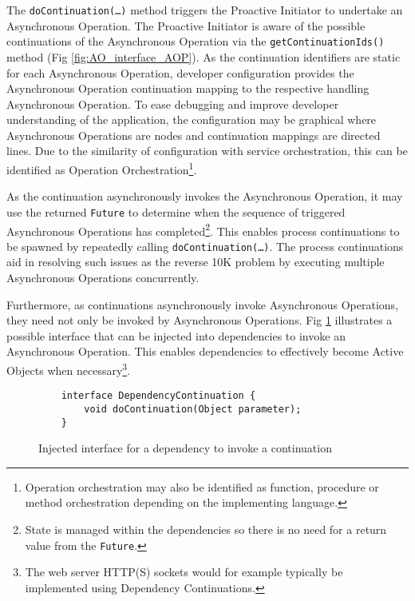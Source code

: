 \documentclass[prodmode]{style/acmlarge}
\begin{document}
The \texttt{doContinuation(\ldots)} method triggers the Proactive Initiator to
undertake an Asynchronous Operation.  The Proactive Initiator is aware of the
possible continuations of the Asynchronous Operation via the
\texttt{getContinuationIds()} method (Fig \ref{fig:AO_interface_AOP}).  As the
continuation identifiers are static for each Asynchronous Operation, developer
configuration provides the Asynchronous Operation continuation mapping to the
respective handling Asynchronous Operation.  To ease debugging and improve
developer understanding of the application, the configuration may be graphical
where Asynchronous Operations are nodes and continuation mappings are directed
lines.  Due to the similarity of configuration with service orchestration, this
can be identified as Operation Orchestration\footnote{Operation orchestration
may also be identified as function, procedure or method orchestration depending
on the implementing language.}.

As the continuation asynchronously invokes the Asynchronous Operation, it may
use the returned \texttt{Future} to determine when the sequence of triggered
Asynchronous Operations has completed\footnote{State is managed within the
dependencies so there is no need for a return value from the \texttt{Future}.}.
This enables process continuations \cite{process-continuation} to be spawned by
repeatedly calling \texttt{doContinuation(\ldots)}.  The process continuations
aid in resolving such issues as the reverse 10K problem
\cite{reverse-ten-k-problem} by executing multiple Asynchronous Operations
concurrently.

Furthermore, as continuations asynchronously invoke Asynchronous Operations,
they need not only be invoked by Asynchronous Operations. Fig
\ref{fig:DC_interface} illustrates a possible interface that can be injected
into dependencies to invoke an Asynchronous Operation.  This enables
dependencies to effectively become Active Objects \cite{active-object} when
necessary\footnote{The web server HTTP(S) sockets would for example typically be
implemented using Dependency Continuations.}.

\begin{figure}[tp]
\begin{verbatim}
    interface DependencyContinuation {
        void doContinuation(Object parameter);
    }
\end{verbatim}
\caption{Injected interface for a dependency to invoke a continuation}
\label{fig:DC_interface}
\end{figure}
\end{document}
